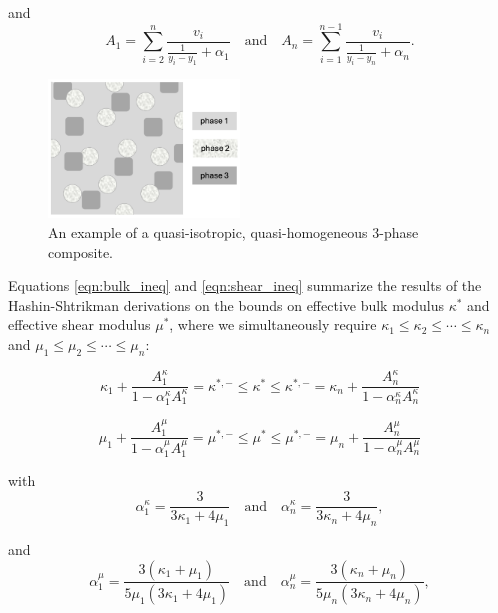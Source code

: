 \documentclass[letterpaper,12pt]{formatfile}
\begin{document}
\noindent and
\begin{equation}
A_{1} = \sum\limits_{i=2}^{n} \frac{v_{i}}{\frac{1}{y_{i} - y_{1}} + \alpha_{1}}
\quad \text{and} \quad
A_{n} = \sum\limits_{i=1}^{n-1} \frac{v_{i}}{\frac{1}{y_{i} - y_{n}} + \alpha_{n}}.
\label{eqn:gen_As}
\end{equation}


\begin{figure}
    \centering
    \includegraphics[width=2in]{figures/3phase_composite.png}
    \caption{An example of a quasi-isotropic, quasi-homogeneous 3-phase composite.}
    \label{fig:cartoon-3phase}
\end{figure}

Equations \ref{eqn:bulk_ineq} and \ref{eqn:shear_ineq} summarize the results of the Hashin-Shtrikman derivations on the bounds on effective bulk modulus $\kappa^{*}$ and effective shear modulus $\mu^{*}$, where we simultaneously require $\kappa_{1} \leq \kappa_{2} \leq \dotsb \leq \kappa_{n}$ and $\mu_{1} \leq \mu_{2} \leq \dotsb \leq \mu_{n}$:

\begin{equation}
\kappa_{1} + \frac{A_{1}^{\kappa}}{1 - \alpha_{1}^{\kappa}A_{1}^{\kappa}}
= \kappa^{*,-} \leq \kappa^{*} \leq \kappa^{*,-} = 
\kappa_{n} + \frac{A_{n}^{\kappa}}{1 - \alpha_{n}^{\kappa}A_{n}^{\kappa}}
\label{eqn:bulk_ineq}
\end{equation}

\begin{equation}
\mu_{1} + \frac{A_{1}^{\mu}}{1 - \alpha_{1}^{\mu}A_{1}^{\mu}}
= \mu^{*,-} \leq \mu^{*} \leq \mu^{*,-} = 
\mu_{n} + \frac{A_{n}^{\mu}}{1 - \alpha_{n}^{\mu}A_{n}^{\mu}}
\label{eqn:shear_ineq}
\end{equation}

\noindent with
\begin{equation}
\alpha_{1}^{\kappa} = \frac{3}{3\kappa_{1} + 4\mu_{1}}
\quad \text{and} \quad
\alpha_{n}^{\kappa} = \frac{3}{3\kappa_{n} + 4\mu_{n}},
\label{eqn:bulk_alphas}
\end{equation}

\noindent and
\begin{equation}
\alpha_{1}^{\mu} = \frac{3(\kappa_{1} + \mu_{1})}{5\mu_{1}(3\kappa_{1} + 4\mu_{1})}
\quad \text{and} \quad
\alpha_{n}^{\mu} = \frac{3(\kappa_{n} + \mu_{n})}{5\mu_{n}(3\kappa_{n} + 4\mu_{n})},
\label{eqn:shear_alphas}
\end{equation}
\end{document}
